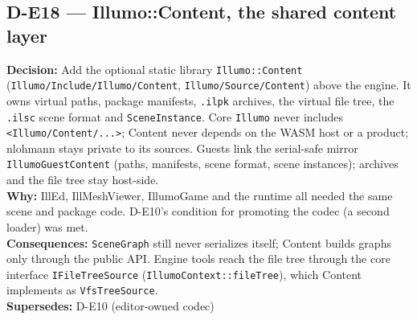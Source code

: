 \subsection*{D-E18 --- Illumo::Content, the shared content layer}
\begin{decisionbox}[title={D-E18 \quad 2026-09-23}]
\textbf{Decision:} Add the optional static library \texttt{Illumo::Content}
(\texttt{Illumo/Include/Illumo/Content}, \texttt{Illumo/Source/Content}) above
the engine. It owns virtual paths, package manifests, \texttt{.ilpk} archives,
the virtual file tree, the \texttt{.ilsc} scene format and
\texttt{SceneInstance}. Core \texttt{Illumo} never includes
\texttt{<Illumo/Content/...>}; Content never depends on the WASM host or a
product; nlohmann stays private to its sources. Guests link the serial-safe
mirror \texttt{IllumoGuestContent} (paths, manifests, scene format, scene
instances); archives and the file tree stay host-side.\\
\textbf{Why:} IllEd, IllMeshViewer, IllumoGame and the runtime all needed the
same scene and package code. D-E10's condition for promoting the codec (a
second loader) was met.\\
\textbf{Consequences:} \texttt{SceneGraph} still never serializes itself;
Content builds graphs only through the public API. Engine tools reach the
file tree through the core interface \texttt{IFileTreeSource}
(\texttt{IllumoContext::fileTree}), which Content implements as
\texttt{VfsTreeSource}.\\
\textbf{Supersedes:} D-E10 (editor-owned codec)
\end{decisionbox}

